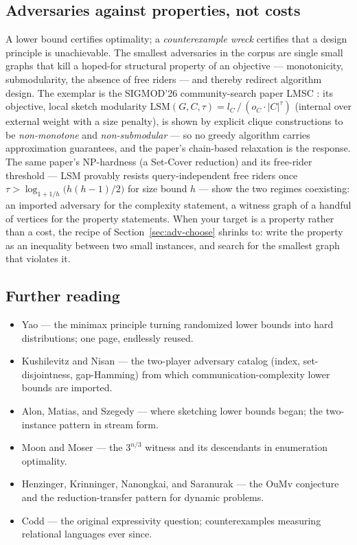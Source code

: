 \subsection{Adversaries against properties, not costs}
\label{sec:adv-wrecks}

A lower bound certifies optimality; a \emph{counterexample wreck} certifies that a design
principle is unachievable. The smallest adversaries in the corpus are single small graphs that
kill a hoped-for structural property of an objective --- monotonicity, submodularity, the
absence of free riders --- and thereby redirect algorithm design. The exemplar is the
SIGMOD'26 community-search paper LMSC \citep{sigmod26-150}: its objective, local sketch
modularity $\mathrm{LSM}(G,C,\tau) = l_C\,/\,(o_C\cdot|C|^{\tau})$ (internal over external
weight with a size penalty), is shown by explicit clique constructions to be
\emph{non-monotone} and \emph{non-submodular} --- so no greedy algorithm carries approximation
guarantees, and the paper's chain-based relaxation is the response. The same paper's
NP-hardness (a Set-Cover reduction) and its free-rider threshold --- LSM provably resists
query-independent free riders once $\tau > \log_{1+1/h}\!\bigl(h(h-1)/2\bigr)$ for size bound
$h$ --- show the two regimes coexisting: an imported adversary for the complexity statement, a
witness graph of a handful of vertices for the property statements. When your target is a
property rather than a cost, the recipe of Section~\ref{sec:adv-choose} shrinks to: write the
property as an inequality between two small instances, and search for the smallest graph that
violates it.

\subsection{Further reading}

\begin{itemize}
\item Yao \citep{adversarial-construction-bg1} --- the minimax principle turning randomized
  lower bounds into hard distributions; one page, endlessly reused.
\item Kushilevitz and Nisan \citep{adversarial-construction-bg2} --- the two-player adversary
  catalog (index, set-disjointness, gap-Hamming) from which communication-complexity lower
  bounds are imported.
\item Alon, Matias, and Szegedy \citep{adversarial-construction-bg3} --- where sketching lower
  bounds began; the two-instance pattern in stream form.
\item Moon and Moser \citep{adversarial-construction-bg4} --- the $3^{n/3}$ witness and its
  descendants in enumeration optimality.
\item Henzinger, Krinninger, Nanongkai, and Saranurak \citep{adversarial-construction-bg5} ---
  the OuMv conjecture and the reduction-transfer pattern for dynamic problems.
\item Codd \citep{adversarial-construction-bg6} --- the original expressivity question;
  counterexamples measuring relational languages ever since.
\end{itemize}

